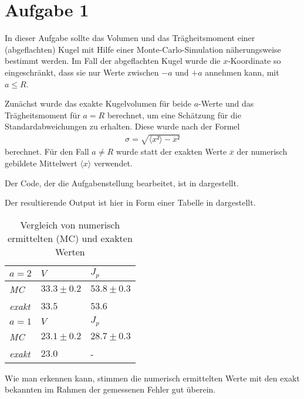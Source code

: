 \section*{Aufgabe 1}
In dieser Aufgabe sollte das Volumen und das Trägheitsmoment einer (abgeflachten)
Kugel mit Hilfe einer Monte-Carlo-Simulation näherungsweise bestimmt werden. Im Fall
der abgeflachten Kugel wurde die $x$-Koordinate so eingeschränkt, dass sie nur Werte 
zwischen $-a$ und $+a$ annehmen kann, mit $a\le R$.

Zunächst wurde das exakte Kugelvolumen für beide $a$-Werte und das Trägheitsmoment
für $a=R$ berechnet, um eine Schätzung für die Standardabweichungen zu erhalten.
Diese wurde nach der Formel
\begin{eqnarray}
σ = \sqrt{\langle x²\rangle - \overline{x}²}
\end{eqnarray}
berechnet. Für den Fall $a\ne R$ wurde statt der exakten Werte $\overline{x}$ der numerisch
gebildete Mittelwert $\langle x \rangle$ verwendet.

Der Code, der die Aufgabenstellung bearbeitet, ist in  dargestellt.



Der resultierende Output ist hier in Form einer Tabelle in  dargestellt.

\begin{table}[htbp]
\centering
\setlength{\tabcolsep}{14pt}
\begin{tabular*}{0.5\columnwidth}{lll}
\toprule
$a = 2$ & {$V$} & {$J_p$}\\
\midrule
\textit{MC} & $ 33.3\pm0.2 $ & $ 53.8\pm0.3 $ \\
\textit{exakt} & $ 33.5 $ & $ 53.6 $ \\
\midrule
$a = 1$ & {$V$} & {$J_p$}\\
\midrule
\textit{MC} & $ 23.1\pm0.2 $ & $ 28.7\pm0.3 $ \\
\textit{exakt} & $ 23.0 $ & - \\
\bottomrule
\end{tabular*}
\caption{Vergleich von numerisch ermittelten (MC) und exakten Werten}
\label{tab:erg}
\end{table}

Wie man erkennen kann, stimmen die numerisch ermittelten Werte mit den exakt bekannten
im Rahmen der gemessenen Fehler gut überein.